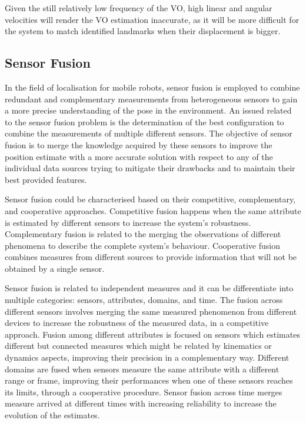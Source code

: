 
Given the still relatively low frequency of the \gls{VO}, high linear and angular velocities will render the \gls{VO} estimation inaccurate, as it will be more difficult for the system to match identified landmarks when their displacement is bigger.
    


\subsection{Sensor Fusion}

\noindent 
In the field of localisation for mobile robots, sensor fusion is employed to combine redundant and complementary measurements from heterogeneous sensors to gain a more precise understanding of the pose in the environment.
An issued related to the sensor fusion problem is the determination of the best configuration to combine the measurements of multiple different sensors. 
The objective of sensor fusion is to merge the knowledge acquired by these sensors to improve the position estimate with a more accurate solution with respect to any of the individual data sources trying to mitigate their drawbacks and to maintain their best provided features\cite{mitchell_multi-sensor_2007}.

Sensor fusion could be characterised based on their competitive, complementary, and cooperative approaches\cite{1199023}. 
Competitive fusion happens when the same attribute is estimated by different sensors to increase the system's robustness.
Complementary fusion is related to the merging the observations of different phenomena to describe the complete system's behaviour. 
Cooperative fusion combines measures from different sources to provide information that will not be obtained by a single sensor.

Sensor fusion is related to independent measures and it can be differentiate into multiple categories: sensors, attributes, domains, and time\cite{weckenmann_multisensor_2009}.
The fusion across different sensors involves merging the same measured phenomenon from different devices to increase the robustness of the measured data, in a competitive approach.
Fusion among different attributes is focused on sensors which estimates different but connected measures which might be related by kinematics or dynamics aspects, improving their precision in a complementary way.
Different domains are fused when sensors measure the same attribute with a different range or frame, improving their performances when one of these sensors reaches its limits, through a cooperative procedure.
Sensor fusion across time merges measure arrived at different times with increasing reliability to increase the evolution of the estimates.

